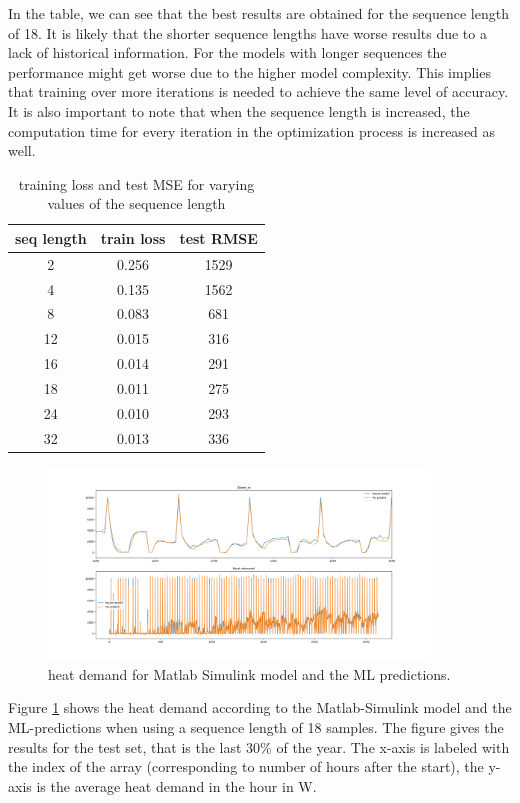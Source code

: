 In the table, we can see that the best results are obtained for the sequence length of 18. It is likely that the shorter sequence lengths have worse results due to a lack of historical information. For the models with longer sequences the performance might get worse due to the higher model complexity. This implies that training over more iterations is needed to achieve the same level of accuracy. It is also important to note that when the sequence length is increased, the computation time for every iteration in the optimization process is increased as well.  
\begin{table}
	\centering
		\begin{tabular}{c|c|c}
			\hline
			seq length & train loss & test RMSE  \\
			\hline
			\hline
			2 & 0.256 & 1529\\
			4 & 0.135 & 1562\\
			8 & 0.083	& 681\\
			12 & 0.015 & 316\\	
			16 & 0.014 & 291\\
			18 & 0.011 & 275\\
			24 & 0.010 & 293\\
			32 & 0.013 & 336\\
			\hline
		\end{tabular}
	\caption{training loss and test MSE for varying values of the sequence length}
	\label{tab:results_simulink}
\end{table}


\begin{figure}
	\centering
		\includegraphics[width = 0.9\textwidth]{figures/seq_18_epoch_1000_Matlab1.png}
		\caption{heat demand for Matlab Simulink model and the ML predictions.}
	\label{fig:matlab_seq18}
\end{figure}

Figure \ref{fig:matlab_seq18} shows the heat demand according to the Matlab-Simulink model and the ML-predictions when using a sequence length of 18 samples. The figure gives the results for the test set, that is the last 30\% of the year. The x-axis is labeled with the index of the array (corresponding to number of hours after the start), the y-axis is the average heat demand in the hour in W. 

